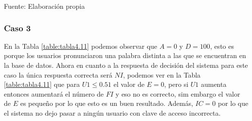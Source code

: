 \begin{center}
\begin{table}[H]
\centering
\caption{\small{Resultados para obtener U1 en el caso 2.}}
\label{table:tabla4.10}
\vskip 0.2cm
\begin{center}
\vskip 0.2cm
{\small{Fuente: Elaboración propia}}
\end{center}
\end{table}
\end{center}

\subsubsection{Caso 3}
En la Tabla \ref{table:tabla4.11} podemos observar que $A = 0$ y $D = 100$, esto es porque los usuarios pronunciaron una palabra distinta a las que se encuentran en la base de datos.
\vskip 0.5cm
Ahora en cuanto a la respuesta de decisión del sistema para este caso la única respuesta correcta será $NI$, podemos ver en la Tabla \ref{table:tabla4.11} que para $U1 \leq 0.51$ el valor de $E = 0$, pero si $U1$ aumenta entonces aumentará el número de $FI$ y eso no es correcto, sim embargo el valor de $E$ es pequeño por lo que esto es un buen resultado. Además, $IC = 0$ por lo que el sistema no dejo pasar a ningún usuario con clave de acceso incorrecta.

